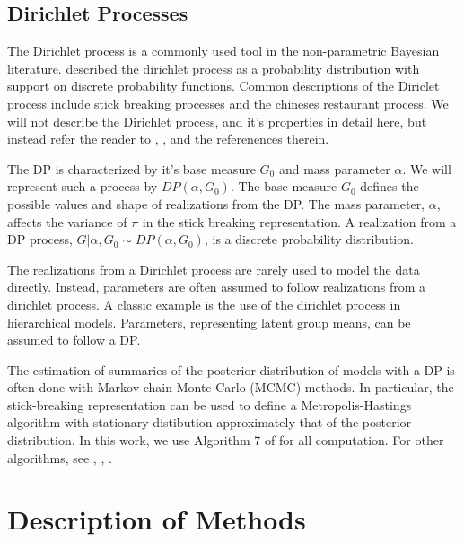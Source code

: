 \documentclass[11pt,a4paper,notitlepage]{article}
\begin{document}
\subsection{Dirichlet Processes}

The Dirichlet process \citep{Fergeson, otherguy} is a commonly used
tool in the non-parametric Bayesian literature.  \cite{someguy} described
the dirichlet process as a probability distribution with support on
discrete probability functions.  Common descriptions of the Diriclet
process include stick breaking processes and the chineses restaurant
process.  We will not describe the Dirichlet process, and it's
properties in detail here, but instead refer the reader to \cite{dp1},
\cite{dp2}, and the referenences therein.  

The DP is characterized by it's base measure $G_0$ and mass parameter
$\alpha$.  We will represent such a process by $DP(\alpha, G_0)$. The
base measure $G_0$ defines the possible values and shape of
realizations from the DP.  The mass parameter, $\alpha$, affects the
variance of $\pi$ in the stick breaking representation.  A realization
from a DP process, $G|\alpha, G_0\sim DP(\alpha,G_0)$, is a discrete
probability distribution.

The realizations from a Dirichlet process are rarely used to model the
data directly.  Instead, parameters are often assumed to follow
realizations from a dirichlet process.  A classic example is the use
of the dirichlet process in hierarchical models.  Parameters,
representing latent group means, can be assumed to follow a DP.

The estimation of summaries of the posterior distribution of models
with a DP is often done with Markov chain Monte Carlo (MCMC) methods.  In
particular, the stick-breaking representation can be used to define a
Metropolis-Hastings algorithm with stationary distibution
approximately that of the posterior distribution.  In this work, we
use Algorithm 7 of \cite{Neal2006} for all computation.  For other
algorithms, see \cite{?}, \cite{??}, \cite{???}.


\section{Description of Methods}
\end{document}
